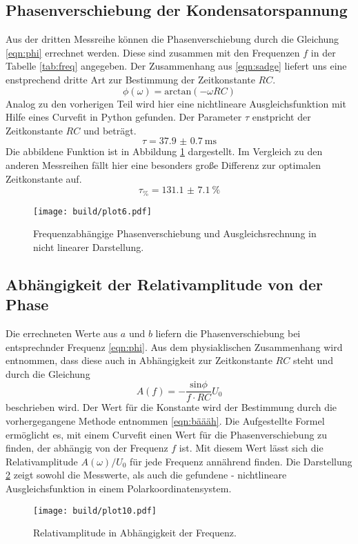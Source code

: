 \subsection{Phasenverschiebung der Kondensatorspannung}
Aus der dritten Messreihe können die Phasenverschiebung durch die Gleichung \eqref{eqn:phi} errechnet werden. Diese sind zusammen
mit den Frequenzen $f$ in der Tabelle \ref{tab:freq} angegeben.
Der Zusammenhang aus \eqref{eqn:sadge} liefert uns eine enstprechend dritte Art zur Bestimmung der Zeitkonstante $RC$.
\begin{equation}
    \phi(\omega) = \text{arctan}(-\omega RC)
\end{equation}
Analog zu den vorherigen Teil wird hier eine nichtlineare Ausgleichsfunktion mit Hilfe eines Curvefit in Python gefunden.
Der Parameter $\tau$ enstpricht der Zeitkonstante $RC$ und beträgt.
\begin{equation}
    \label{eqn:bäääh}
    \tau = \SI{37.9(07)}{\ms}
\end{equation}
Die abbildene Funktion ist in Abbildung \ref{fig:plttausend} dargestellt. Im Vergleich zu den anderen Messreihen fällt hier eine besonders
große Differenz zur optimalen Zeitkonstante auf.
\begin{equation*}
    \label{eqn:Mp1kompletterMuell}
    \tau_{\si{\percent}} = \SI{131.1(71)}{\percent}
\end{equation*}
\begin{figure}
    \centering 
    \texttt{[image: build/plot6.pdf]}
    \caption{Frequenzabhängige Phasenverschiebung und Ausgleichsrechnung in nicht linearer Darstellung.}
    \label{fig:plttausend}
\end{figure} 

\subsection{Abhängigkeit der Relativamplitude von der Phase}
Die errechneten Werte aus $a$ und $b$ liefern die Phasenverschiebung
bei entsprechnder Frequenz \eqref{eqn:phi}. Aus dem physiaklischen Zusammenhang wird entnommen,
dass diese auch in Abhängigkeit zur Zeitkonstante $RC$ steht und durch die Gleichung 
\begin{equation*}
    A(f)=-\frac{\text{sin{$\phi$}}}{f \cdot RC}U_0
\end{equation*}
beschrieben wird. Der Wert für die Konstante wird der Bestimmung durch die vorhergegangene Methode entnommen \eqref{eqn:bäääh}.
Die Aufgestellte Formel ermöglicht es, mit einem Curvefit einen Wert für die Phasenverschiebung zu finden, der abhängig 
von der Frequenz $f$ ist. 
Mit diesem Wert lässt sich die Relativamplitude $A(\omega)/U_0$ für jede Frequenz annährend finden. Die Darstellung 
\ref{fig:pltmill}
zeigt sowohl die Messwerte, als auch die gefundene - nichtlineare Ausgleichsfunktion in einem Polarkoordinatensystem.

\begin{figure}
    \centering 
    \texttt{[image: build/plot10.pdf]}
    \caption{Relativamplitude in Abhängigkeit der Frequenz.}
    \label{fig:pltmill}
\end{figure} 


